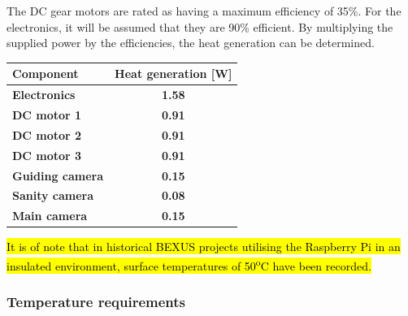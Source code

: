 The DC gear motors are rated as having a maximum efficiency of 35\%. For the electronics, it will be assumed that they are 90\% efficient. By multiplying the supplied power by the efficiencies, the heat generation can be determined. \\

\begin{center}
  \begin{tabular}{ | l | c | }
    \hline
    \textbf{Component} & \textbf{Heat generation [W]}\\ 
    \hline
    \textbf{Electronics}  & \textbf{1.58} \\ 
    \hline
    \textbf{DC motor 1}  & \textbf{0.91} \\
    \hline
    \textbf{DC motor 2}  & \textbf{0.91} \\ 
    \hline
    \textbf{DC motor 3}  & \textbf{0.91} \\
    \hline
    \textbf{Guiding camera}  & \textbf{0.15} \\
    \hline
    \textbf{Sanity camera}  & \textbf{0.08} \\ 
    \hline
    \textbf{Main camera}  & \textbf{0.15}\\ 
    \hline
  \end{tabular}
\end{center}

\hl{It is of note that in historical BEXUS projects utilising the Raspberry Pi in an insulated environment, surface temperatures of 50\textsuperscript{o}C have been recorded.} \\


\subsubsection{Temperature requirements}

